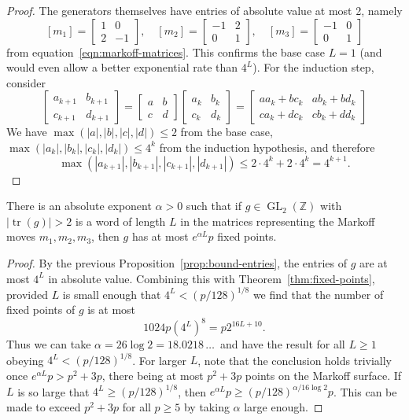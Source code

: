 \documentclass[AHL, Unicode, longabstracts, published]{cedram}
\newcommand{\Z}{\mathbb{Z}}
\DeclareMathOperator{\tr}{tr}
\DeclareMathOperator{\GL}{GL}
\DeclareMathOperator{\GL}{GL}
\newcommand{\Z}{\mathbb{Z}}
\begin{document}
\begin{proof}
The generators themselves have entries of absolute value at most 2, namely
\[
[m_1] =
\begin{bmatrix}
1 & 0 \\
2 & -1
\end{bmatrix},\quad [m_2] =
\begin{bmatrix}
-1 & 2 \\
0 & 1
\end{bmatrix},\quad [m_3] =
\begin{bmatrix}
-1 & 0 \\
0 & 1
\end{bmatrix}
\]
from equation~\eqref{eqn:markoff-matrices}. This confirms the base case $L=1$ (and would even allow a better exponential rate than $4^L$). For the induction step, consider
\[
\begin{bmatrix} a_{k+1} & b_{k+1} \\ c_{k+1} & d_{k+1}
\end{bmatrix}
=
\begin{bmatrix} a & b \\ c & d
\end{bmatrix}
\begin{bmatrix} a_k & b_k\\ c_k & d_k
\end{bmatrix}
=
\begin{bmatrix}
aa_k + bc_k & ab_k+bd_k \\ ca_k + dc_k & cb_k + dd_k
\end{bmatrix}
\]
We have $\max(|a|,|b|,|c|,|d|) \leq 2$ from the base case, $\max(|a_{k}|,|b_{k}|,|c_{k}|,|d_{k}|) \leq 4^k$ from the induction hypothesis, and therefore
\[
\max(|a_{k+1}|,|b_{k+1}|,|c_{k+1}|,|d_{k+1}|) \leq 2 \cdot 4^k + 2 \cdot 4^k = 4^{k+1}.
\]
\end{proof}

\begin{coro}
There is an absolute exponent $\alpha > 0$ such that if $g \in \GL_2(\Z)$ with $|\tr(g)|>2$ is a word of length $L$ in the matrices representing the Markoff moves $m_1,m_2,m_3$, then $g$ has at most $e^{\alpha L}p$ fixed points.
\end{coro}
\begin{proof}
By the previous Proposition~\ref{prop:bound-entries}, the entries of $g$ are at most $4^L$ in absolute value. Combining this with Theorem~\ref{thm:fixed-points}, provided $L$ is small enough that $4^L < (p/128)^{1/8}$ we find that the number of fixed points of $g$ is at most
\[
1024 p \left(4^L\right)^8 = p 2^{16L+10}.
\]
Thus we can take $\alpha = 26\log{2} = 18.0218\,\ldots\,$ and have the result for all $L \geq 1$ obeying $4^L < (p/128)^{1/8}$. For larger $L$, note that the conclusion holds trivially once $e^{\alpha L}p > p^2+3p$, there being at most $p^2+3p$ points on the Markoff surface. If $L$ is so large that $4^L \geq (p/128)^{1/8}$, then $e^{\alpha L}p \geq (p/128)^{\alpha/16\log{2}} p$. This can be made to exceed $p^2+3p$ for all $p \geq 5$ by taking $\alpha$ large enough.
\end{proof}
\end{document}
